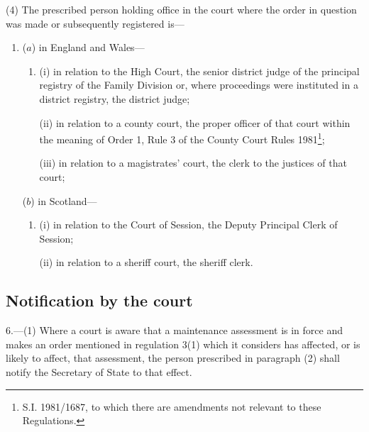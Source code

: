 \documentclass[a4paper]{article}
\begin{document}
(4) The prescribed person holding office in the court where the order in question was made or subsequently registered is—
\begin{enumerate}\item[]
($a$) in England and Wales—
\begin{enumerate}\item[]
(i) in relation to the High Court, the senior district judge of the principal registry of the Family Division or, where proceedings were instituted in a district registry, the district judge;

(ii) in relation to a county court, the proper officer of that court within the meaning of Order 1, Rule 3 of the County Court Rules 1981\footnote{\frenchspacing S.I. 1981/1687, to which there are amendments not relevant to these Regulations.};

(iii) in relation to a magistrates' court, the clerk to the justices of that court;
\end{enumerate}

($b$) in Scotland—
\begin{enumerate}\item[]
(i) in relation to the Court of Session, the Deputy Principal Clerk of Session;

(ii) in relation to a sheriff court, the sheriff clerk.
\end{enumerate}
\end{enumerate}

\subsection[6. Notification by the court]{Notification by the court}

6.—(1) Where a court is aware that a maintenance assessment is in force and makes an order mentioned in regulation 3(1) which it considers has affected, or is likely to affect, that assessment, the person prescribed in paragraph (2) shall notify the Secretary of State to that effect.
\end{document}
